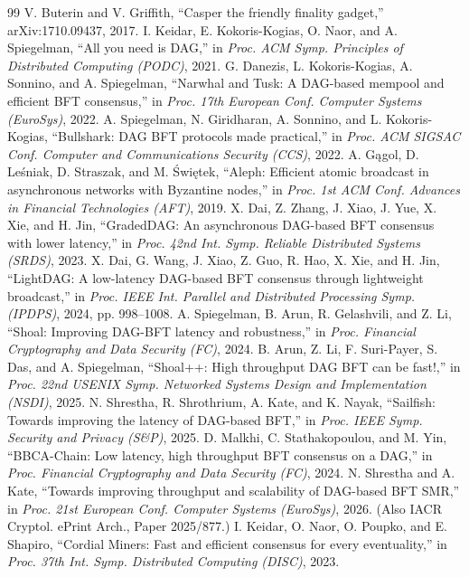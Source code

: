 \documentclass[UTF8,fontset=windows,a4paper,11pt]{ctexart}
\begin{document}
\begin{thebibliography}{99}
 V. Buterin and V. Griffith, “Casper the friendly finality gadget,” arXiv:1710.09437, 2017.
 I. Keidar, E. Kokoris-Kogias, O. Naor, and A. Spiegelman, “All you need is DAG,” in \textit{Proc. ACM Symp. Principles of Distributed Computing (PODC)}, 2021.
 G. Danezis, L. Kokoris-Kogias, A. Sonnino, and A. Spiegelman, “Narwhal and Tusk: A DAG-based mempool and efficient BFT consensus,” in \textit{Proc. 17th European Conf. Computer Systems (EuroSys)}, 2022.
 A. Spiegelman, N. Giridharan, A. Sonnino, and L. Kokoris-Kogias, “Bullshark: DAG BFT protocols made practical,” in \textit{Proc. ACM SIGSAC Conf. Computer and Communications Security (CCS)}, 2022.
 A. Gągol, D. Leśniak, D. Straszak, and M. Świętek, “Aleph: Efficient atomic broadcast in asynchronous networks with Byzantine nodes,” in \textit{Proc. 1st ACM Conf. Advances in Financial Technologies (AFT)}, 2019.
 X. Dai, Z. Zhang, J. Xiao, J. Yue, X. Xie, and H. Jin, “GradedDAG: An asynchronous DAG-based BFT consensus with lower latency,” in \textit{Proc. 42nd Int. Symp. Reliable Distributed Systems (SRDS)}, 2023.
 X. Dai, G. Wang, J. Xiao, Z. Guo, R. Hao, X. Xie, and H. Jin, “LightDAG: A low-latency DAG-based BFT consensus through lightweight broadcast,” in \textit{Proc. IEEE Int. Parallel and Distributed Processing Symp. (IPDPS)}, 2024, pp. 998–1008.
 A. Spiegelman, B. Arun, R. Gelashvili, and Z. Li, “Shoal: Improving DAG-BFT latency and robustness,” in \textit{Proc. Financial Cryptography and Data Security (FC)}, 2024.
 B. Arun, Z. Li, F. Suri-Payer, S. Das, and A. Spiegelman, “Shoal++: High throughput DAG BFT can be fast!,” in \textit{Proc. 22nd USENIX Symp. Networked Systems Design and Implementation (NSDI)}, 2025.
 N. Shrestha, R. Shrothrium, A. Kate, and K. Nayak, “Sailfish: Towards improving the latency of DAG-based BFT,” in \textit{Proc. IEEE Symp. Security and Privacy (S\&P)}, 2025.
 D. Malkhi, C. Stathakopoulou, and M. Yin, “BBCA-Chain: Low latency, high throughput BFT consensus on a DAG,” in \textit{Proc. Financial Cryptography and Data Security (FC)}, 2024.
 N. Shrestha and A. Kate, “Towards improving throughput and scalability of DAG-based BFT SMR,” in \textit{Proc. 21st European Conf. Computer Systems (EuroSys)}, 2026. (Also IACR Cryptol. ePrint Arch., Paper 2025/877.)
 I. Keidar, O. Naor, O. Poupko, and E. Shapiro, “Cordial Miners: Fast and efficient consensus for every eventuality,” in \textit{Proc. 37th Int. Symp. Distributed Computing (DISC)}, 2023.

\end{thebibliography}
\end{document}
